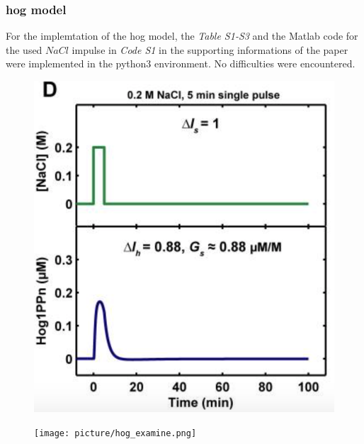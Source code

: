 \subsubsection{hog model}
For the implemtation of the hog model, the \textit{Table S1-S3} and the Matlab code for the used $NaCl$ impulse in \textit{Code S1 } in the supporting informations of the paper were implemented in the python3 environment. No difficulties were encountered. 

\begin{figure}[htbp]
	
	\begin{minipage}{0,5\textwidth}
		
		\includegraphics[width=\textwidth]{picture/Hog_Paper.png}
		
		\label{hogPaper} 
	\end{minipage}
	\begin{minipage}{0,5\textwidth}
		
		\texttt{[image: picture/hog\_examine.png]}
		
		\label{hogImplemented} 
	\end{minipage}
	\caption{}
\end{figure}

